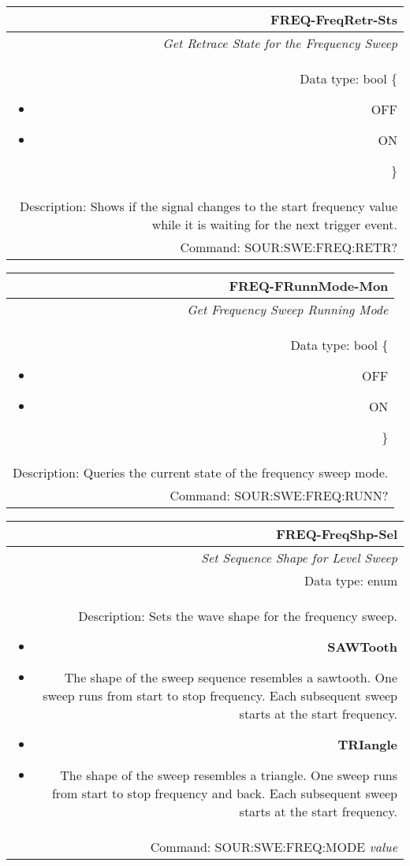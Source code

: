 \documentclass[openany]{article}
\begin{document}
		\begin{tabular}{N}
			\hline
			\bfseries FREQ-FreqRetr-Sts \\ \hline
			\emph{Get Retrace State for the Frequency Sweep} \\
			Data type: bool \{\begin{itemize}[noitemsep]
				\small
				\item[] OFF
				\item[] ON
			\end{itemize}\} \\
			Description: Shows if the signal changes to the start frequency value while it is waiting for the next trigger event. \\
			Command: SOUR:SWE:FREQ:RETR? \\

		\end{tabular}
%
		\begin{tabular}{N}
			\hline
			\bfseries FREQ-FRunnMode-Mon \\ \hline
			\emph{Get Frequency Sweep Running Mode} \\
			Data type: bool \{\begin{itemize}[noitemsep]
				\small
				\item[] OFF
				\item[] ON
			\end{itemize}\} \\
			Description: Queries the current state of the frequency sweep mode. \\
			Command: SOUR:SWE:FREQ:RUNN? \\

		\end{tabular}
%
		\begin{tabular}{N}
			\hline
			\bfseries FREQ-FreqShp-Sel \\ \hline
			\emph{Set Sequence Shape for Level Sweep} \\
			Data type: enum \\
			Description: Sets the wave shape for the frequency sweep.\begin{itemize}[noitemsep]
				\small
				\item[] \textbf{SAWTooth}
				\item[] The shape of the sweep sequence resembles a sawtooth. One sweep runs from start to stop frequency. Each subsequent sweep starts at the start frequency.
				\item[] \textbf{TRIangle}
				\item[] The shape of the sweep resembles a triangle. One sweep runs from start to stop frequency and back. Each subsequent sweep starts at the start frequency.
			\end{itemize} \\
			Command: SOUR:SWE:FREQ:MODE \emph{value} \\

		\end{tabular}
\end{document}
